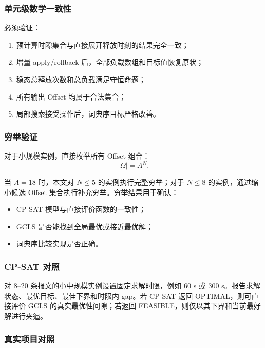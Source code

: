 \documentclass[UTF8,12pt,a4paper]{ctexart}
\begin{document}
\subsubsection{单元级数学一致性}

必须验证：

\begin{enumerate}
  \item 预计算时隙集合与直接展开释放时刻的结果完全一致；
  \item 增量 apply/rollback 后，全部负载数组和目标值恢复原状；
  \item 稳态总释放次数和总负载满足守恒命题；
  \item 所有输出 Offset 均属于合法集合；
  \item 局部搜索接受操作后，词典序目标严格改善。
\end{enumerate}

\subsubsection{穷举验证}

对于小规模实例，直接枚举所有 Offset 组合：
\begin{equation}
 |\Omega|=A^N.
\end{equation}

当 $A=18$ 时，本文对 $N\le5$ 的实例执行完整穷举；对于 $N\le8$ 的实例，通过缩小候选 Offset 集合执行补充穷举。穷举结果用于确认：

\begin{itemize}
  \item CP-SAT 模型与直接评价函数的一致性；
  \item GCLS 是否能找到全局最优或接近最优解；
  \item 词典序比较实现是否正确。
\end{itemize}

\subsubsection{CP-SAT 对照}

对 8--20 条报文的小中规模实例设置固定求解时限，例如 60 s 或 300 s。报告求解状态、最优目标、最佳下界和时限内 gap。若 CP-SAT 返回 OPTIMAL，则可直接评价 GCLS 的真实最优性间隙；若返回 FEASIBLE，则仅以其下界和当前最好解进行夹逼。

\subsubsection{真实项目对照}
\end{document}
